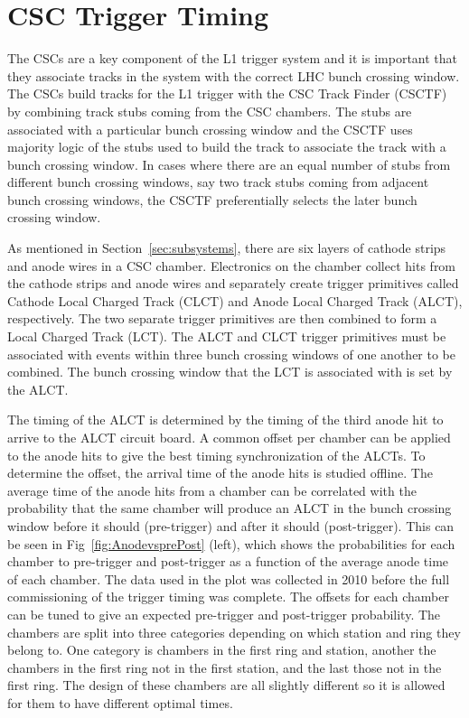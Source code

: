 \section{CSC Trigger Timing}

The CSCs are a key component of the L1 trigger system and it is important that they associate tracks in the system with the correct LHC bunch crossing window.
The CSCs build tracks for the L1 trigger with the CSC Track Finder (CSCTF)~\cite{2003physics...6117A} by combining track stubs coming from the CSC chambers. 
The stubs are associated with a particular bunch crossing window and
the CSCTF uses majority logic of the stubs used to build the track to associate the track with a bunch crossing window. In cases where there are an equal number
of stubs from different bunch crossing windows, say two track stubs coming from adjacent bunch crossing windows, the CSCTF preferentially selects the later bunch crossing window.

As mentioned in Section~\ref{sec:subsystems}, there are six layers of cathode strips and anode wires in a CSC chamber.
Electronics on the chamber collect hits from the cathode strips and anode wires and separately create trigger primitives called Cathode Local Charged Track (CLCT)
and Anode Local Charged Track (ALCT), respectively. The two separate trigger primitives are then combined to form a Local Charged Track (LCT). The ALCT and CLCT trigger primitives
must be associated with events within three bunch crossing windows of one another to be combined.
The bunch crossing window that the LCT is associated with is set by the ALCT.

The timing of the ALCT is determined by the timing of the third anode hit 
to arrive to the ALCT circuit board. A common offset per chamber can be applied to the
anode hits to give the best timing synchronization of the ALCTs. To determine the offset, the arrival time of the anode hits is studied offline. The average time of the anode
hits from a chamber can be correlated with the probability that the same chamber will produce an ALCT in the bunch crossing 
window before it should (pre-trigger) and after it should (post-trigger).
This can be seen in Fig~\ref{fig:AnodevsprePost} (left), which shows the probabilities for each chamber to pre-trigger and post-trigger as a function of the average
anode time of each chamber. The data used in the plot was collected in 2010 before the full commissioning of the trigger timing was complete.
The offsets for each chamber can be tuned to give an expected pre-trigger and post-trigger probability.
The chambers are split into three categories depending on which station and ring they belong to. One category is chambers in the
first ring and station, another the chambers in the first ring not in the first station, and the last those not in the first ring. The design of these chambers are all
slightly different so it is allowed for them to have different optimal times.

